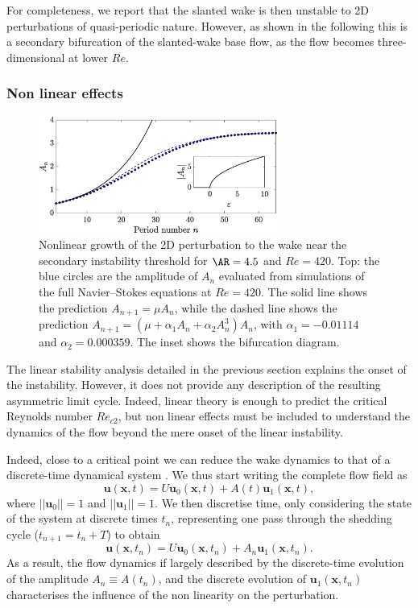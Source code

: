 For completeness, we report that the slanted wake is then unstable to 2D perturbations of quasi-periodic nature. However, as shown in the following this is a secondary bifurcation of the slanted-wake base flow, as the flow becomes three-dimensional at lower $Re$.

\subsubsection{Non linear effects}

\begin{figure}
  \centering
  \includegraphics[width=0.7\textwidth]{./fig/AR4p5/Nlgrowth_Re420.eps}
  \caption{Nonlinear growth of the 2D perturbation to the wake near the secondary instability threshold for $\AR=4.5$ and $Re=420$. Top: the blue circles are the amplitude of $A_n$ evaluated from simulations of the full Navier--Stokes equations at $Re=420$. The solid line shows the prediction $A_{n+1} = \mu A_n$, while the dashed line shows the prediction $A_{n+1} = ( \mu + \alpha_1 A_n + \alpha_2 A_n^3 ) A_n$, with $\alpha_1 = -0.01114$ and $\alpha_2 = 0.000359$. The inset shows the bifurcation diagram.}
  \label{fig:ar4p5_nnl}
\end{figure}

The linear stability analysis detailed in the previous section explains the onset of the instability. However, it does not provide any description of the resulting asymmetric limit cycle. Indeed, linear theory is enough to predict the critical Reynolds number $Re_{c2}$, but non linear effects must be included to understand the dynamics of the flow beyond the mere onset of the linear instability. 

Indeed, close to a critical point we can reduce the wake dynamics to that of a discrete-time dynamical system \citep{henderson-barkley-1996,henderson-1997}. We thus start writing the complete flow field as
%
\begin{equation}
  \bm{u}(\bm{x},t) =  U \bm{u}_0(\bm{x},t) + A(t) \bm{u}_1(\bm{x},t),
\end{equation}
%
where $|| \bm{u}_0 || = 1 $ and $|| \bm{u}_1 || = 1$. We then discretise time, only considering the state of the system at discrete times $t_n$, representing one pass through the shedding cycle ($t_{n+1} = t_n + T$) to obtain
%
\begin{equation}
  \bm{u}(\bm{x},t_n) = U \bm{u}_0(\bm{x},t_n) + A_n \bm{u}_1(\bm{x},t_n).
\end{equation}
%
As a result, the flow dynamics if largely described by the discrete-time evolution of the amplitude $A_n \equiv A(t_n)$, and the discrete evolution of $\bm{u}_1(\bm{x},t_n)$ characterises the influence of the non linearity on the perturbation.

